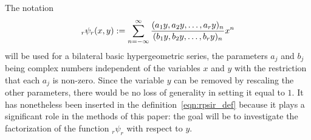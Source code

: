\documentclass[pdftex]{sigma}
\numberwithin{equation}{section}
\begin{document}
The notation
\begin{equation} \label{eqn:rpsir_def}
_r\psi_r(x,y) := \sum_{n=-\infty}^\infty {(a_1 y, a_2 y, \dots, a_r y)_n \over (b_1 y, b_2 y, \dots, b_r y)_n} x^n
\end{equation}
will be used for a bilateral basic hypergeometric series, the parameters $a_j$ and $b_j$ being complex numbers independent of the variables $x$ and $y$ with the restriction that each $a_j$ is non-zero. Since the variable $y$ can be removed by rescaling the other parameters, there would be no loss of generality in setting it equal to $1$. It has nonetheless been inserted in the definition~\eqref{eqn:rpsir_def} because it plays a significant role in the methods of this paper: the goal will be to investigate the factorization of the function $_r\psi_r$ with respect to $y$.
\end{document}
